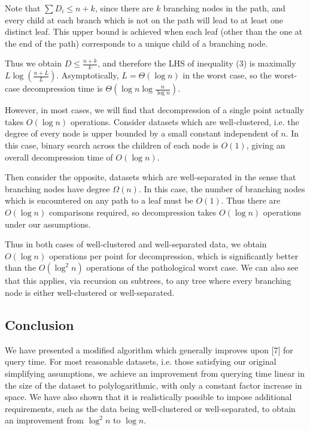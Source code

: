 \documentclass{article}
\begin{document}
Note that $\sum D_i \leq n + k$, since there are $k$ branching nodes in the path, and
every child at each branch which is not on the path will lead to at least one
distinct leaf. This upper bound is achieved when each leaf (other than the one
at the end of the path) corresponds to a unique child of a branching node.

Thus we obtain $D \leq \frac{n + k}{k}$, and therefore the LHS of inequality (3) is
maximally $L \log (\frac{n+L}{L})$. Asymptotically, $L = \Theta(\log n)$ in the worst
case, so the worst-case decompression time is $\Theta(\log n \log \frac{n}{\log n})$.

However, in most cases, we will find that decompression of a single point
actually takes $O(\log n)$ operations. Consider datasets which are
well-clustered, i.e. the degree of every node is upper bounded by a small
constant independent of $n$. In this case, binary search across the children of
each node is $O(1)$, giving an overall decompression time of $O(\log n)$.

Then consider the opposite, datasets which are well-separated in the sense that
branching nodes have degree $\Omega(n)$. In this case, the number of branching nodes
which is encountered on any path to a leaf must be $O(1)$. Thus there are
$O(\log n)$ comparisons required, so decompression takes $O(\log n)$ operations
under our assumptions.

Thus in both cases of well-clustered and well-separated data, we obtain $O(\log
n)$ operations per point for decompression, which is significantly better than
the $O(\log^2 n)$ operations of the pathological worst case. We can also see
that this applies, via recursion on subtrees, to any tree where every branching
node is either well-clustered or well-separated.

\subsection{Conclusion}

We have presented a modified algorithm which generally improves upon [7] for
query time. For most reasonable datasets, i.e. those satisfying our original
simplifying assumptions, we achieve an improvement from querying time linear in
the size of the dataset to polylogarithmic, with only a constant factor increase
in space. We have also shown that it is realistically possible to impose
additional requirements, such as the data being well-clustered or
well-separated, to obtain an improvement from $\log^2 n$ to $\log n$.
\end{document}
